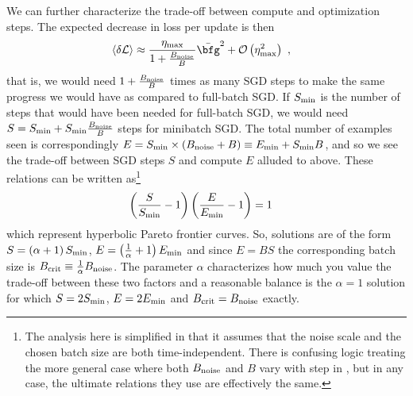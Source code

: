 We can further characterize the trade-off between compute and optimization steps. The expected
decrease in loss per update is then
\begin{align}
	\langle \delta \Lcal \rangle & \approx \frac{ \eta _{ {\rm  max} } }{ 1 + \frac{ B _{ {\rm  noise} } }{ B } } \bar{\bfg } ^{2 } + \Ocal \left( \eta _{ {\rm max} } ^{ 2 } \right) \ ,
\end{align}
that is, we would need $ 1 + \frac{ B _{ {\rm noise} } }{ B } $ times as many SGD steps to make the
same progress we would have as compared to full-batch SGD. If $ S _{ {\rm  min} } $ is the number of
steps that would have been needed for full-batch SGD, we would need $ S=S _{ {\rm  min} } + S _{
			{\rm  min} } \frac{ B _{ {\rm noise} } }{ B } $ steps for minibatch SGD.  The total number of
examples seen is correspondingly $ E = S _{ {\rm  min} } \times  \left ( B _{ {\rm  noise} } +B
	\right)\equiv E _{ {\rm min} }+ S _{ {\rm  min} }B $, and so we see the trade-off between SGD steps
$ S $ and compute $ E $ alluded to above.  These relations can be written as\footnote{The analysis
	here is simplified in that it assumes that the noise scale and the chosen batch size are both
	time-independent. There is confusing logic treating the more general case where both
	$ B _{ {\rm noise} } $ and $ B $ vary with step in \cite{mccandlish2018empirical}, but in any case,
	the ultimate relations they use are effectively the same.}
\begin{align}
	\left ( \frac{ S }{ S _{ {\rm  min} } }-1 \right )\left ( \frac{ E }{ E _{ {\rm min} } }-1 \right ) & =1
\end{align}
which represent hyperbolic Pareto frontier curves. So, solutions are of the form $ S=\left ( \alpha
	+1 \right )S _{ {\rm  min} } $, $ E=\left ( \frac{ 1 }{ \alpha  } +1 \right )E _{ {\rm  min} } $
and since $E=BS $ the corresponding batch size is $ B _{ {\rm crit} } \equiv  \frac{ 1 }{ \alpha  }
	B _{ {\rm noise} }$. The parameter $ \alpha $ characterizes how much you value the trade-off between
these two factors and a reasonable balance is the $ \alpha =1 $ solution for which $S = 2S _{ {\rm
					min} } $, $ E=2E _{ {\rm min} } $ and $ B _{ {\rm crit} }= B _{ {\rm  noise} } $ exactly.

